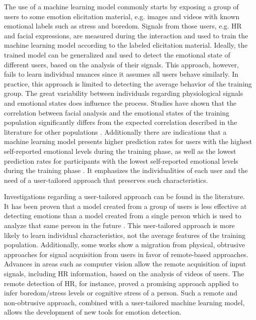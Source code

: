 The use of a machine learning model commonly starts by exposing a group of users to some emotion elicitation material, e.g. images and videos with known emotional labels such as stress and boredom. Signals from those users, e.g. HR and facial expressions, are measured during the interaction and used to train the machine learning model according to the labeled elicitation material. Ideally, the trained model can be generalized and used to detect the emotional state of different users, based on the analysis of their signals. This approach, however, fails to learn individual nuances since it assumes all users behave similarly. In practice, this approach is limited to detecting the average behavior of the training group. The great variability between individuals regarding physiological signals and emotional states does influence the process. Studies have shown that the correlation between facial analysis and the emotional states of the training population significantly differs from the expected correlation described in the literature for other populations \parencite{grafsgaard2013automatically}. Additionally there are indications that a machine learning model presents higher prediction rates for users with the highest self-reported emotional levels during the training phase, as well as the lowest prediction rates for participants with the lowest self-reported emotional levels during the training phase \parencite{mcduffcogcam}. It emphasizes the individualities of each user and the need of a user-tailored approach that preserves such characteristics.

Investigations regarding a user-tailored approach can be found in the literature. It has been proven that a model created from a group of users is less effective at detecting emotions than a model created from a single person which is used to analyze that same person in the future \parencite{bailenson2008real}. This user-tailored approach is more likely to learn individual characteristics, not the average features of the training population. Additionally, some works show a migration from physical, obtrusive approaches for signal acquisition from users in favor of remote-based approaches. Advances in areas such as computer vision allow the remote acquisition of input signals, including HR information, based on the analysis of videos of users. The remote detection of HR, for instance, proved a promising approach applied to infer boredom/stress levels \parencite{kukolja2014comparative} or cognitive stress \parencite{mcduff2014remote} of a person. Such a remote and non-obtrusive approach, combined with a user-tailored machine learning model, allows the development of new tools for emotion detection.

